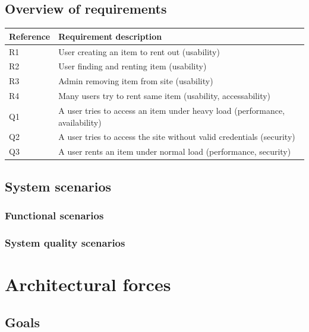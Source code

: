 \documentclass[a4paper,11pt]{report}
\begin{document}
\section{Overview of requirements}
\label{sec:overv-requ}
\begin{center}
  \begin{tabular}[h]{| l |  l |}
    \hline
    \textbf{Reference} & \textbf{Requirement description} \\
    \hline
    R1 & User creating an item to rent out (usability)\\
    \hline
    R2 & User finding and renting item (usability)\\
    \hline
    R3 & Admin removing item from site (usability)\\
    \hline
    R4 & Many users try to rent same item (usability, accessability)\\
    \hline
    Q1 & A user tries to access an item under heavy load (performance, availability)\\
    \hline
    Q2 & A user tries to access the site without valid credentials (security)\\
    \hline
    Q3 & A user rents an item under normal load (performance, security)\\
    \hline
  \end{tabular}
\end{center}

\section{System scenarios}
\label{sec:system-scenarios}


\subsection{Functional scenarios}
\label{sec:functional-scenarios}


\subsection{System quality scenarios}
\label{sec:syst-qual-scen}


\chapter{Architectural forces}
\label{cha:architectural-forces}
\thispagestyle{fancy}

\section{Goals}
\label{sec:goals}
\end{document}
